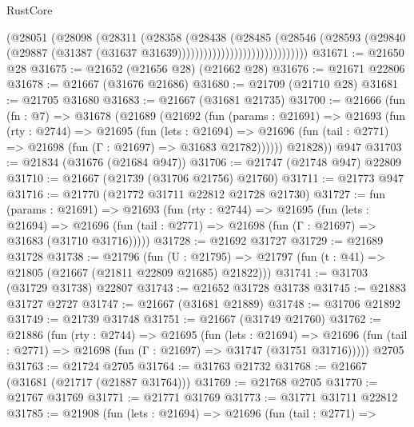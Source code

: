 \begin{lexlean}{RustCore}
\begin{coremodule}
                                        (@28051
                                          (@28098
                                            (@28311
                                              (@28358
                                                (@28438
                                                  (@28485
                                                    (@28546
                                                      (@28593
                                                        (@29840
                                                          (@29887
                                                            (@31387
                                                              (@31637
                                                                @31639))))))))))))))))))))))))))))))
@31671 := @21650 @28
@31675 := @21652 (@21656 @28) (@21662 @28)
@31676 := @21671 @22806
@31678 := @21667 (@31676 @21686)
@31680 := @21709 (@21710 @28)
@31681 := @21705 @31680
@31683 := @21667 (@31681 @21735)
@31700 := @21666
    (fun (fn : @7) =>
    @31678
      (@21689
        (@21692
          (fun (params : @21691) =>
          @21693
            (fun (rty : @2744) =>
            @21695
              (fun (lets : @21694) =>
              @21696 (fun (tail : @2771) => @21698 (fun (Γ : @21697) => @31683 @21782))))))
        @21828))
    @947
@31703 := @21834 (@31676 (@21684 @947))
@31706 := @21747 (@21748 @947) @22809
@31710 := @21667 (@21739 (@31706 @21756) @21760)
@31711 := @21773 @947
@31716 := @21770 (@21772 @31711 @22812 @21728 @21730)
@31727 := fun (params : @21691) =>
  @21693
    (fun (rty : @2744) =>
    @21695
      (fun (lets : @21694) =>
      @21696 (fun (tail : @2771) => @21698 (fun (Γ : @21697) => @31683 (@31710 @31716)))))
@31728 := @21692 @31727
@31729 := @21689 @31728
@31738 := @21796
    (fun (U : @21795) => @21797 (fun (t : @41) => @21805 (@21667 (@21811 @22809 @21685) @21822)))
@31741 := @31703 (@31729 @31738) @22807
@31743 := @21652 @31728 @31738
@31745 := @21883 @31727 @2727
@31747 := @21667 (@31681 @21889)
@31748 := @31706 @21892
@31749 := @21739 @31748
@31751 := @21667 (@31749 @21760)
@31762 := @21886
    (fun (rty : @2744) =>
    @21695
      (fun (lets : @21694) =>
      @21696 (fun (tail : @2771) => @21698 (fun (Γ : @21697) => @31747 (@31751 @31716)))))
    @2705
@31763 := @21724 @2705
@31764 := @31763 @21732
@31768 := @21667 (@31681 (@21717 (@21887 @31764)))
@31769 := @21768 @2705
@31770 := @21767 @31769
@31771 := @21771 @31769
@31773 := @31771 @31711 @22812
@31785 := @21908
    (fun (lets : @21694) =>
    @21696
      (fun (tail : @2771) =>

\end{coremodule}
\end{lexlean}

